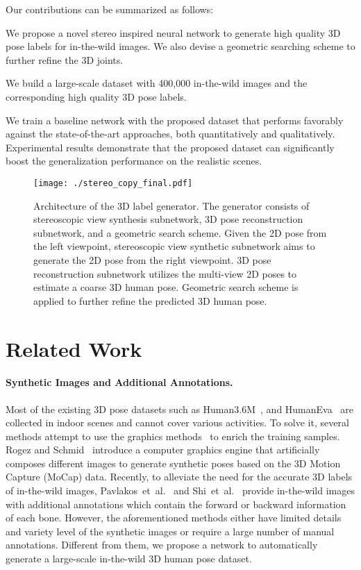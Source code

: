 \documentclass[10pt,twocolumn,letterpaper]{article}
\def\etal{et~al.\xspace}
\begin{document}
Our contributions can be summarized as follows:
\begin{compactitem}
   \item We propose a novel stereo inspired neural network to generate high quality 3D pose labels for in-the-wild images. We also devise a geometric searching scheme to further refine the 3D joints.
\item We build a large-scale dataset with 400,000 in-the-wild images and the corresponding high quality 3D pose labels.
\item We train a baseline network with the proposed dataset that performs favorably against the state-of-the-art approaches, both quantitatively and qualitatively. 
Experimental results demonstrate that the proposed dataset can significantly boost the generalization performance on the realistic scenes.
\end{compactitem}

\begin{figure*}[!t]
\footnotesize
\centering
\texttt{[image: ./stereo\_copy\_final.pdf]}
\vspace{-2mm}
\caption{Architecture of the 3D label generator. 
The generator consists of stereoscopic view synthesis subnetwork, 3D pose reconstruction subnetwork, and a geometric search scheme.
Given the 2D pose from the left viewpoint, stereoscopic view synthetic subnetwork aims to generate the 2D pose from the right viewpoint.
3D pose reconstruction subnetwork utilizes the multi-view 2D poses to estimate a coarse 3D human pose.
Geometric search scheme is applied to further refine the predicted 3D human pose.}
\vspace{-2mm}
\label{intro:pipline}
\end{figure*}

\section{Related Work}
\paragraph{Synthetic Images and Additional Annotations.}
Most of the existing 3D pose datasets such as Human3.6M~\cite{h36m_pami}, and HumanEva~\cite{sigal2010humaneva} are collected in indoor scenes and cannot cover various activities.
To solve it, several methods attempt to use the graphics methods~\cite{chen2016synthesizing, mehta2017monocular, pishchulin2012articulated, varol2017learning} to enrich the training samples.
Rogez and Schmid~\cite{rogez2016mocap} introduce a computer graphics engine that artificially composes different images to generate synthetic poses based on the 3D Motion Capture (MoCap) data.
Recently, to alleviate the need for the accurate 3D labels of in-the-wild images, Pavlakos~\etal~\cite{pavlakos2018ordinal} and Shi~\etal~\cite{shi2018fbi} provide in-the-wild images with additional annotations which contain the forward or backward information of each bone. However, the aforementioned methods either have limited details and variety level of the synthetic images or require a large number of manual annotations.
Different from them, we propose a network to automatically generate a large-scale in-the-wild 3D human pose dataset.
\end{document}

